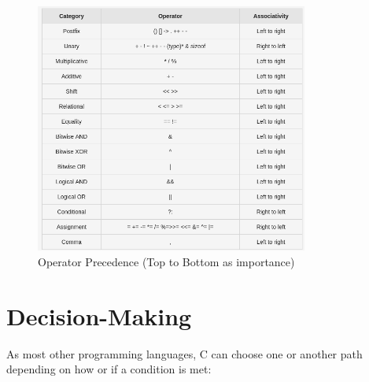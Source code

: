 \documentclass[a4paper, 11pt]{article}
\begin{document}
\newpage

\begin{figure}[htb!]
    \centering
    \includegraphics[width=0.8\textwidth]{oper_precedence}
    \caption{Operator Precedence (Top to Bottom as importance)}
    \label{fig:oper_precedence}
\end{figure}

\newpage

\section{Decision-Making}

As most other programming languages, C can choose one or another path depending on how or if a condition is met:
\end{document}
